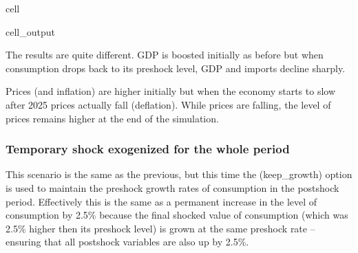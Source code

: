 \documentclass[letterpaper,10pt,english]{jupyterBook}
\begin{document}
\begin{sphinxuseclass}{cell}
\begin{sphinxVerbatimOutput}
\begin{sphinxuseclass}{cell_output}
\noindent{}

\end{sphinxuseclass}\end{sphinxVerbatimOutput}

\end{sphinxuseclass}
\sphinxAtStartPar
The results are quite different.  GDP is boosted initially as before but when consumption drops back to its pre\sphinxhyphen{}shock level, GDP and imports decline sharply.

\sphinxAtStartPar
Prices (and inflation) are higher initially but when the economy starts to slow after 2025 prices actually fall (deflation). While prices are falling, the level of prices remains higher at the end of the simulation.


\subsubsection{Temporary shock exogenized for the whole period}
\label{\detokenize{content/05_WBModels/ScenarioAnalysis:temporary-shock-exogenized-for-the-whole-period}}
\sphinxAtStartPar
This scenario is the same as the previous, but this time the  (keep\_growth) option is used to maintain the pre\sphinxhyphen{}shock growth rates of consumption in the post\sphinxhyphen{}shock period.  Effectively this is the same as a permanent increase in the level of consumption by 2.5\% because the final shocked value of consumption (which was 2.5\% higher then its pre\sphinxhyphen{}shock level) is grown at the same pre\sphinxhyphen{}shock rate – ensuring that all post\sphinxhyphen{}shock variables are also up by 2.5\%.
\end{document}
